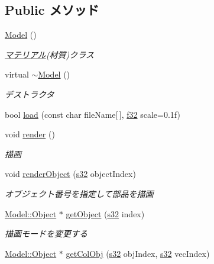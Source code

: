 \subsection*{Public メソッド}
\begin{DoxyCompactItemize}
\item 
\hyperlink{class_model_ae3b375de5f6df4faf74a95d64748e048}{Model} ()
\begin{DoxyCompactList}\small\item\em \hyperlink{class_xE3_x83_x9E_xE3_x83_x86_xE3_x83_xAA_xE3_x82_xA2_xE3_x83_xAB}{マテリアル}(材質)クラス \end{DoxyCompactList}\item 
virtual \hyperlink{class_model_ad6ebd2062a0b823db841a0b88baac4c0}{$\sim$\-Model} ()
\begin{DoxyCompactList}\small\item\em デストラクタ \end{DoxyCompactList}\item 
bool \hyperlink{class_model_aa6d90fa11fac2b3bbf4597597f2c3f9c}{load} (const char file\-Name\mbox{[}$\,$\mbox{]}, \hyperlink{_main_8h_a5f6906312a689f27d70e9d086649d3fd}{f32} scale=0.\-1f)
\item 
void \hyperlink{class_model_a89ebd61864089abe5b0c5a1df6479970}{render} ()
\begin{DoxyCompactList}\small\item\em 描画 \end{DoxyCompactList}\item 
void \hyperlink{class_model_a9361d76a7079ff0db78ef823a4858371}{render\-Object} (\hyperlink{_main_8h_a0ce6887c26c1c49ad3be5710dd42bfd6}{s32} object\-Index)
\begin{DoxyCompactList}\small\item\em オブジェクト番号を指定して部品を描画 \end{DoxyCompactList}\item 
\hyperlink{class_model_1_1_object}{Model\-::\-Object} $\ast$ \hyperlink{class_model_ad36e641665acb9391435e90140cbefe5}{get\-Object} (\hyperlink{_main_8h_a0ce6887c26c1c49ad3be5710dd42bfd6}{s32} index)
\begin{DoxyCompactList}\small\item\em 描画モードを変更する \end{DoxyCompactList}\item 
\hyperlink{class_model_1_1_object}{Model\-::\-Object} $\ast$ \hyperlink{class_model_ab49eaee1aa8f4b485902e25cd05e9fd1}{get\-Col\-Obj} (\hyperlink{_main_8h_a0ce6887c26c1c49ad3be5710dd42bfd6}{s32} obj\-Index, \hyperlink{_main_8h_a0ce6887c26c1c49ad3be5710dd42bfd6}{s32} vec\-Index)

\end{DoxyCompactItemize}
